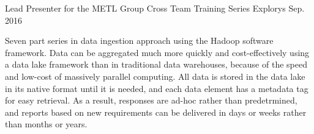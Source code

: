 \begin{cventries}
  \cventry
    {Lead Presenter for the METL Group} %
    {Cross Team Training Series} %
    {Explorys} %
    {Sep. 2016} %
    {
      \begin{cvitems} %
        \item {Seven part series in data ingestion approach using the Hadoop software framework.  Data can be aggregated much more quickly and cost-effectively using a data lake framework than in traditional data warehouses, because of the speed and low-cost of massively parallel computing.  All data is stored in the data lake in its native format until it is needed, and each data element has a metadata tag for easy retrieval.  As a result, responses are ad-hoc rather than predetrmined, and reports based on new requirements can be delivered in days or weeks rather than months or years.}
      \end{cvitems}
    }

\end{cventries}

